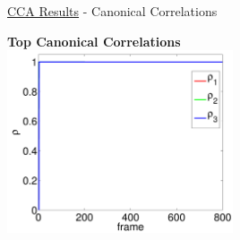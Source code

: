 \documentclass[8pt]{beamer}
\begin{document}
\begin{frame}{\href{run:/home/user/Documents/thesis_vids/flashing_cca.mp4}{CCA Results} -
    Canonical Correlations}


    \begin{center}
      \textbf{Top Canonical Correlations }\\
      \includegraphics[width=0.5\textwidth]{figures/flashing_cca_corrs.pdf}
    \end{center}


\end{frame}
\end{document}
